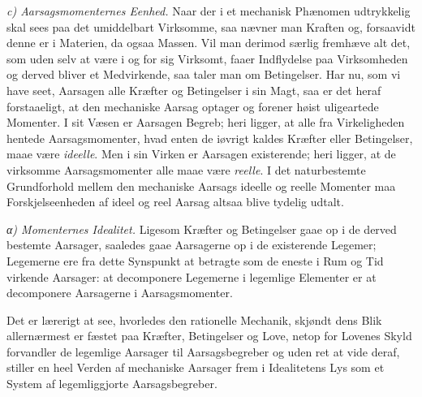 \documentclass[12pt,a4paper]{book}
\newcommand{\runin}[1]{\emph{#1}\hspace{0.4em}}
\newcommand{\subrunin}[1]{\emph{#1}\hspace{0.4em}}
\begin{document}
\runin{c) Aarsagsmomenternes Eenhed.} Naar der i et mechanisk Phænomen
udtrykkelig skal sees paa det umiddelbart Virksomme, saa nævner man
Kraften og, forsaavidt denne er i Materien, da ogsaa Massen. Vil man
derimod særlig fremhæve alt det, som uden selv at være i og for sig
Virksomt, faaer Indflydelse paa Virksomheden og derved bliver et
Medvirkende, saa taler man om Betingelser. Har nu, som vi have seet,
Aarsagen alle Kræfter og Betingelser i sin Magt, saa er det heraf
forstaaeligt, at den mechaniske Aarsag optager og forener høist
uligeartede Momenter. I sit Væsen er Aarsagen Begreb; heri ligger, at
alle fra Virkeligheden hentede Aarsagsmomenter, hvad enten de iøvrigt
kaldes Kræfter eller Betingelser, maae være \emph{ideelle}. Men i sin
Virken er Aarsagen existerende; heri ligger, at de
virksomme Aarsagsmomenter alle maae være \emph{reelle}. I det
naturbestemte Grundforhold mellem den mechaniske Aarsags ideelle og
reelle Momenter maa Forskjelseenheden af ideel og reel Aarsag altsaa
blive tydelig udtalt.

\subrunin{α) Momenternes Idealitet.} Ligesom Kræfter og Betingelser
gaae op i de derved bestemte Aarsager, saaledes gaae Aarsagerne op i de
existerende Legemer; Legemerne ere fra dette Synspunkt at betragte som
de eneste i Rum og Tid virkende Aarsager: at decomponere Legemerne i
legemlige Elementer er at decomponere Aarsagerne i Aarsagsmomenter.

Det er lærerigt at see, hvorledes den rationelle Mechanik, skjøndt dens
Blik allernærmest er fæstet paa Kræfter, Betingelser og Love, netop for
Lovenes Skyld forvandler de legemlige Aarsager til Aarsagsbegreber og
uden ret at vide deraf, stiller en heel Verden af mechaniske Aarsager
frem i Idealitetens Lys som et System af legemliggjorte
Aarsagsbegreber.
\end{document}
